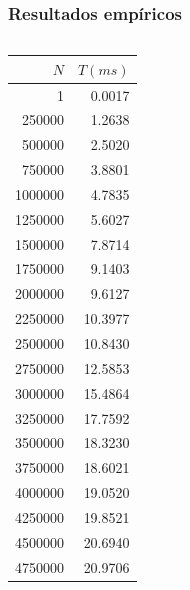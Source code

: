 \documentclass[13pt]{beamer}
\begin{document}
    \begin{frame}
        \frametitle{Resultados empíricos}

        \begin{columns}
            \begin{column}{0.2\textwidth}
                \begin{table}
                    \tiny
                    \centering
                    \begin{tabular}{|r|r|}
                        \hline
                        $N$ & $T(ms)$ \\
                        \hline
                        1 & 0.0017 \\ 
                        250000 & 1.2638 \\ 
                        500000 & 2.5020 \\ 
                        750000 & 3.8801 \\ 
                        1000000 & 4.7835 \\ 
                        1250000 & 5.6027 \\ 
                        1500000 & 7.8714 \\ 
                        1750000 & 9.1403 \\ 
                        2000000 & 9.6127 \\ 
                        2250000 & 10.3977 \\ 
                        2500000 & 10.8430 \\ 
                        2750000 & 12.5853 \\ 
                        3000000 & 15.4864 \\ 
                        3250000 & 17.7592 \\ 
                        3500000 & 18.3230 \\ 
                        3750000 & 18.6021 \\ 
                        4000000 & 19.0520 \\ 
                        4250000 & 19.8521 \\ 
                        4500000 & 20.6940 \\ 
                        4750000 & 20.9706 \\ 
                        \hline
                    \end{tabular}
                \end{table}
            \end{column}


\end{columns}
\end{frame}
\end{document}
